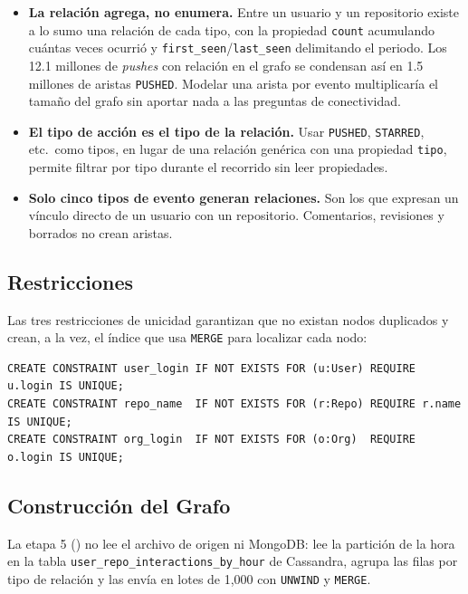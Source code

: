 \begin{itemize}[leftmargin=*]
    \item \textbf{La relación agrega, no enumera.} Entre un usuario y un repositorio existe a lo sumo una relación de cada tipo, con la propiedad \texttt{count} acumulando cuántas veces ocurrió y \texttt{first\_seen}/\texttt{last\_seen} delimitando el periodo. Los 12.1 millones de \textit{pushes} con relación en el grafo se condensan así en 1.5 millones de aristas \texttt{PUSHED}. Modelar una arista por evento multiplicaría el tamaño del grafo sin aportar nada a las preguntas de conectividad.
    \item \textbf{El tipo de acción es el tipo de la relación.} Usar \texttt{PUSHED}, \texttt{STARRED}, etc.\ como tipos, en lugar de una relación genérica con una propiedad \texttt{tipo}, permite filtrar por tipo durante el recorrido sin leer propiedades.
    \item \textbf{Solo cinco tipos de evento generan relaciones.} Son los que expresan un vínculo directo de un usuario con un repositorio. Comentarios, revisiones y borrados no crean aristas.
\end{itemize}

\subsection{Restricciones}

Las tres restricciones de unicidad garantizan que no existan nodos duplicados y crean, a la vez, el índice que usa \texttt{MERGE} para localizar cada nodo:

\begin{lstlisting}[style=plano]
CREATE CONSTRAINT user_login IF NOT EXISTS FOR (u:User) REQUIRE u.login IS UNIQUE;
CREATE CONSTRAINT repo_name  IF NOT EXISTS FOR (r:Repo) REQUIRE r.name  IS UNIQUE;
CREATE CONSTRAINT org_login  IF NOT EXISTS FOR (o:Org)  REQUIRE o.login IS UNIQUE;
\end{lstlisting}

\subsection{Construcción del Grafo}

La etapa 5 () no lee el archivo de origen ni MongoDB: lee la partición de la hora en la tabla \texttt{user\_repo\_\bk{}interactions\_\bk{}by\_hour} de Cassandra, agrupa las filas por tipo de relación y las envía en lotes de 1,000 con \texttt{UNWIND} y \texttt{MERGE}.

